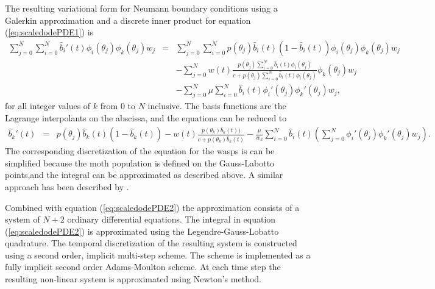 \documentclass[review,authoryear]{elsarticle}
\begin{document}
The resulting variational form for Neumann boundary conditions using a
Galerkin approximation and a discrete inner product for equation
(\ref{eq:scaledodePDE1}) is
\begin{eqnarray}
  \sum_{j=0}^N \sum_{i=0}^N  \hat{b}_i'(t) \phi_i(\theta_j) \phi_k(\theta_j) w_j
  & = &
  \sum_{j=0}^N \sum_{i=0}^N p(\theta_j)  \hat{b}_i(t) (1 - \hat{b}_i(t) ) \phi_i(\theta_j) \phi_k(\theta_j) w_j \\
  & &  -  \sum_{j=0}^N w(t) \frac{p(\theta_j) \sum_{i=0}^N \hat{b}_i(t) \phi_i(\theta_j) }{c+p(\theta_j) \sum_{i=0}^N \hat{b}_i(t) \phi_i(\theta_j)} \phi_k(\theta_j) w_j \nonumber \\ 
  & & - \sum_{j=0}^N \mu  \sum_{i=0}^N \hat{b}_i(t) \phi_i'(\theta_j) \phi_k'(\theta_j)  w_j, \nonumber
\end{eqnarray}
for all integer values of $k$ from $0$ to $N$ inclusive.  The basis
functions are the Lagrange interpolants on the abscissa, and the
equations can be reduced to
\begin{eqnarray}
  \hat{b}_k'(t) 
  & = &
        p(\theta_j) \hat{b}_k(t) (1 - \hat{b}_k(t) )
        -  w(t) \frac{p(\theta_k) \hat{b}_k(t)) }{c+p(\theta_k)  \hat{b}_k(t) }  
   - \frac{\mu}{w_k} \sum_{i=0}^N \hat{b}_i(t) \left( \sum_{j=0}^N  \phi_i'(\theta_j) \phi_k'(\theta_j)  w_j \right).
\end{eqnarray}
The corresponding discretization of the equation for the wasps is can be simplified because the moth population is defined on the Gauss-Labotto points,and the integral can be approximated as described above. A similar approach has been described by \cite{doi:10.1002/mma.1318}.

Combined with equation (\ref{eq:scaledodePDE2}) the approximation
consists of a system of $N+2$ ordinary differential equations. The
integral in equation (\ref{eq:scaledodePDE2}) is approximated using
the Legendre-Gauss-Lobatto quadrature. The temporal discretization of
the resulting system is constructed using a second order, implicit
multi-step scheme. The scheme is implemented as a fully implicit
second order Adams-Moulton scheme\citep{ascher2011first}. At each time
step the resulting non-linear system is approximated using Newton's
method.



\clearpage
%


\end{document}
